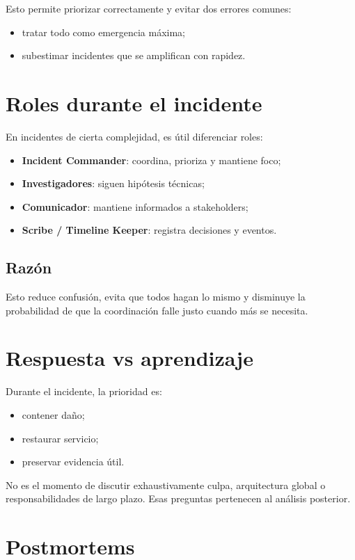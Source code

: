 \documentclass[variant=apuntes,cover=institutional,mode=screen]{ua-engineering-v6-article}
\begin{document}
Esto permite priorizar correctamente y evitar dos errores comunes:
\begin{itemize}
\item tratar todo como emergencia máxima;
\item subestimar incidentes que se amplifican con rapidez.
\end{itemize}

\section{Roles durante el incidente}

En incidentes de cierta complejidad, es útil diferenciar roles:

\begin{itemize}
\item \textbf{Incident Commander}: coordina, prioriza y mantiene foco;
\item \textbf{Investigadores}: siguen hipótesis técnicas;
\item \textbf{Comunicador}: mantiene informados a stakeholders;
\item \textbf{Scribe / Timeline Keeper}: registra decisiones y eventos.
\end{itemize}

\subsection{Razón}

Esto reduce confusión, evita que todos hagan lo mismo y disminuye la probabilidad de que la coordinación falle justo cuando más se necesita.

\section{Respuesta vs aprendizaje}

Durante el incidente, la prioridad es:
\begin{itemize}
\item contener daño;
\item restaurar servicio;
\item preservar evidencia útil.
\end{itemize}

No es el momento de discutir exhaustivamente culpa, arquitectura global o responsabilidades de largo plazo. Esas preguntas pertenecen al análisis posterior.

\section{Postmortems}
\end{document}
